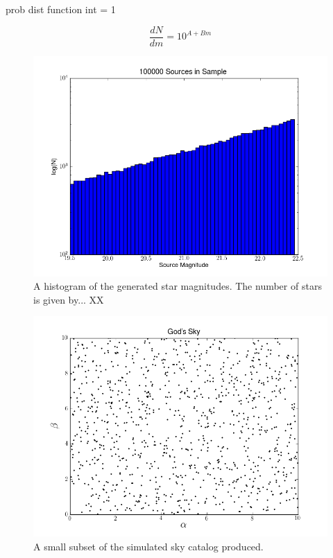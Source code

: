 \documentclass[12pt,a4paper,twoside]{article}
\begin{document}
prob dist function int = 1

\begin{equation}
\frac{d N}{d m} =10^ {A + B m}
\end{equation}

\begin{figure}[ht]
\begin{center}
\includegraphics[width=\textwidth]{source_mag_histogram.png}
\end{center}
\caption{A histogram of the generated star magnitudes. The number of stars is given by... XX \label{fig:source_magnitude}}
\end{figure}

\begin{figure}[ht]
\begin{center}
\includegraphics[width=\textwidth]{gods_sky.png}
\end{center}
\caption{A small subset of the simulated sky catalog produced. \label{fig:gods_sky}}
\end{figure}
\end{document}

